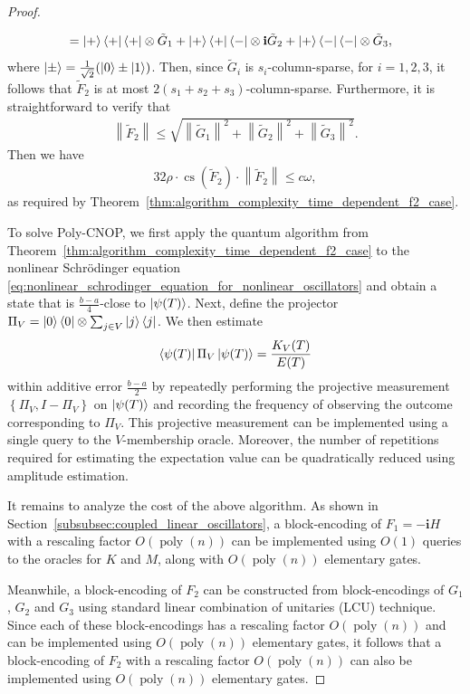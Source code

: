 \documentclass[10pt,a4paper]{amsart}
\theoremstyle{plain}
\theoremstyle{definition}
\theoremstyle{remark}
\newcommand{\norm}[1]     {\left\| #1 \right\|}
\newcommand{\lrb}[1]{\left ( #1 \right )}
\newcommand{\lrcb}[1]{\left \{ #1 \right \}}
\newcommand{\mypoly}[1]{\operatorname{poly} \lrb{#1}}
\newcommand{\myO}[1]{O\lrb{#1}}
\renewcommand{\i}{\ensuremath{\mathbf{i}}}
\begin{document}
\begin{proof}
\begin{itemize}
\begin{align}
& 
=\ket{+}\bra{+}\bra{+} \otimes \tilde{G}_1 +\ket{+}\bra{+}\bra{-} \otimes \i \tilde{G}_2 +\ket{+}\bra{-}\bra{-} \otimes \tilde{G}_3,
\end{align}
where $\ket{\pm}=\frac{1}{\sqrt{2}}(\ket{0} \pm \ket{1})$. Then,
since $\tilde{G}_i$ is $s_i$-column-sparse, for $i=1,2,3$, it follows that $\tilde{F}_2$ is at most $2(s_1+s_2+s_3)$-column-sparse. Furthermore, it is straightforward to verify that
\begin{align}
    \norm{\tilde{F}_2} \le \sqrt{\norm{\tilde{G}_1}^2+\norm{\tilde{G}_2}^2+\norm{\tilde{G}_3}^2}. 
\end{align}
Then we have
\begin{align}
    32 \rho \cdot \operatorname{cs}(\tilde{F}_2) \cdot \norm{\tilde{F}_2} \le c \omega,
\end{align}
as required by Theorem~\ref{thm:algorithm_complexity_time_dependent_f2_case}.
\end{itemize}

To solve Poly-CNOP, we first apply the quantum algorithm from Theorem~\ref{thm:algorithm_complexity_time_dependent_f2_case} to the nonlinear Schr\"{o}dinger equation \eqref{eq:nonlinear_schrodinger_equation_for_nonlinear_oscillators} and obtain a state that is $\frac{b-a}{4}$-close to $\ket{\psi(T)}$. Next, define the projector $\Pi_V= \ket{0}\bra{0}\otimes \sum_{j \in V} \ket{j}\bra{j}$. We then estimate
\begin{align}
   \bra{\psi(T)} \Pi_V \ket{\psi(T)} = \frac{K_V(T)}{E(T)}
\end{align}
within additive error $\frac{b-a}{2}$ by repeatedly performing the projective measurement
$\lrcb{\Pi_V, I-\Pi_V}$ on $\ket{\psi(T)}$ and recording the frequency of observing the outcome corresponding to $\Pi_V$. This projective measurement can be implemented using a single query to the $V$-membership oracle. Moreover, the number of repetitions required for estimating the expectation value can be quadratically reduced using amplitude estimation.

It remains to analyze the cost of the above algorithm. As shown in Section~\ref{subsubsec:coupled_linear_oscillators}, a block-encoding of $F_1=-\i H$ with a rescaling factor $\myO{\mypoly{n}}$ can be implemented using $\myO{1}$ queries to the oracles for $K$ and $M$, along with $\myO{\mypoly{n}}$ elementary gates. 

Meanwhile, a block-encoding of $F_2$ can be constructed from block-encodings of $G_1$, $G_2$ and $G_3$ using standard linear combination of unitaries (LCU) technique. Since each of these block-encodings has a rescaling factor $\myO{\mypoly{n}}$ and can be implemented using $\myO{\mypoly{n}}$ elementary gates, it follows that 
a block-encoding of $F_2$ with a rescaling factor $\myO{\mypoly{n}}$ can also be implemented using $\myO{\mypoly{n}}$ elementary gates. 


\end{proof}
\end{document}
